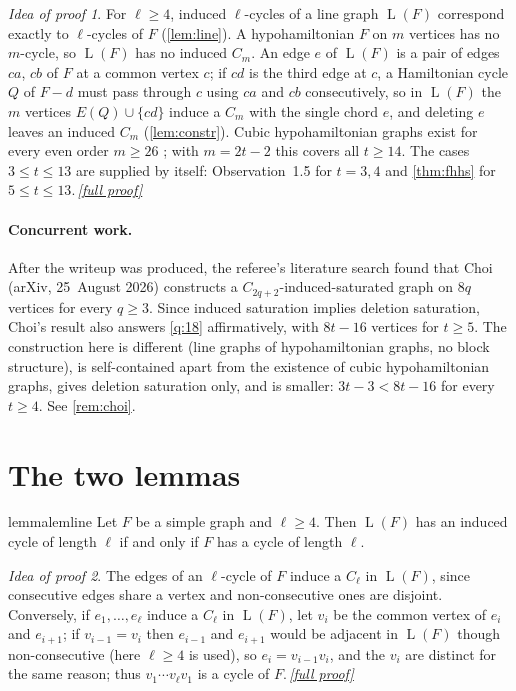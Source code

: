 \documentclass[11pt,a4paper]{article}
\theoremstyle{plain}
\theoremstyle{definition}
\theoremstyle{remark}
\newtheorem*{proofidea}{Idea of proof}
\newcommand{\fullproofref}[1]{\,\hyperref[#1]{\textit{[full proof]}}}
\newcommand{\Ln}{\operatorname{L}}
\begin{document}
\begin{proofidea}
For $\ell\ge4$, induced $\ell$-cycles of a line graph $\Ln(F)$ correspond exactly to $\ell$-cycles of $F$ (\cref{lem:line}). A hypohamiltonian $F$ on $m$ vertices has no $m$-cycle, so $\Ln(F)$ has no induced $C_m$. An edge $e$ of $\Ln(F)$ is a pair of edges $ca$, $cb$ of $F$ at a common vertex $c$; if $cd$ is the third edge at $c$, a Hamiltonian cycle $Q$ of $F-d$ must pass through $c$ using $ca$ and $cb$ consecutively, so in $\Ln(F)$ the $m$ vertices $E(Q)\cup\{cd\}$ induce a $C_m$ with the single chord $e$, and deleting $e$ leaves an induced $C_m$ (\cref{lem:constr}). Cubic hypohamiltonian graphs exist for every even order $m\ge26$ \cite{GZ18}; with $m=2t-2$ this covers all $t\ge14$. The cases $3\le t\le13$ are supplied by \cite{FHHS25} itself: Observation~1.5 for $t=3,4$ and \cref{thm:fhhs} for $5\le t\le13$.\fullproofref{pf:main}
\end{proofidea}

\paragraph{Concurrent work.}
After the writeup was produced, the referee's literature search found that Choi \cite{Choi26} (arXiv, 25~August 2026) constructs a $C_{2q+2}$-induced-saturated graph on $8q$ vertices for every $q\ge3$. Since induced saturation implies deletion saturation, Choi's result also answers \cref{q:18} affirmatively, with $8t-16$ vertices for $t\ge5$. The construction here is different (line graphs of hypohamiltonian graphs, no block structure), is self-contained apart from the existence of cubic hypohamiltonian graphs, gives deletion saturation only, and is smaller: $3t-3<8t-16$ for every $t\ge4$. See \cref{rem:choi}.

\section{The two lemmas}

\begin{restatable}{lemma}{lemline}\label{lem:line}
Let $F$ be a simple graph and $\ell\ge4$. Then $\Ln(F)$ has an induced cycle of length $\ell$ if and only if $F$ has a cycle of length $\ell$.
\end{restatable}
\begin{proofidea}
The edges of an $\ell$-cycle of $F$ induce a $C_\ell$ in $\Ln(F)$, since consecutive edges share a vertex and non-consecutive ones are disjoint. Conversely, if $e_1,\dots,e_\ell$ induce a $C_\ell$ in $\Ln(F)$, let $v_i$ be the common vertex of $e_i$ and $e_{i+1}$; if $v_{i-1}=v_i$ then $e_{i-1}$ and $e_{i+1}$ would be adjacent in $\Ln(F)$ though non-consecutive (here $\ell\ge4$ is used), so $e_i=v_{i-1}v_i$, and the $v_i$ are distinct for the same reason; thus $v_1\cdots v_\ell v_1$ is a cycle of $F$.\fullproofref{pf:line}
\end{proofidea}
\end{document}
